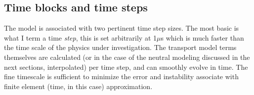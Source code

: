 
\subsection{Time blocks and time steps}\label{sec:time_blocks_and_steps}

The model is associated with two pertinent time step sizes. The most basic is what I term a time \textit{step}, this is set arbitrarily %
at 1$\mu$s which is much faster than the time scale of the physics under investigation. The transport model terms themselves are calculated (or in the case of the neutral modeling discussed in the next sections, interpolated) per time step, and can smoothly evolve in time. The fine timescale is sufficient to minimize the error and instability associate with finite element (time, in this case) approximation.

